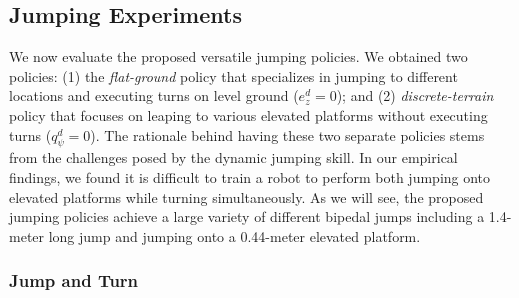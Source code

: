 \subsection{Jumping Experiments}\label{subsec:exp_jumping}
We now evaluate the proposed versatile jumping policies. We obtained two policies: (1) the \textit{flat-ground} policy that specializes in jumping to different locations and executing turns on level ground ($e^d_z=0$); and (2) \textit{discrete-terrain} policy that focuses on leaping to various elevated platforms without executing turns ($q^d_\psi=0$).
The rationale behind having these two separate policies stems from the challenges posed by the dynamic jumping skill. 
In our empirical findings, we found it is difficult to train a robot to perform both jumping onto elevated platforms while turning simultaneously.
As we will see, the proposed jumping policies achieve a large variety of different bipedal jumps including a 1.4-meter long jump and jumping onto a 0.44-meter elevated platform.

\subsubsection{Jump and Turn}

